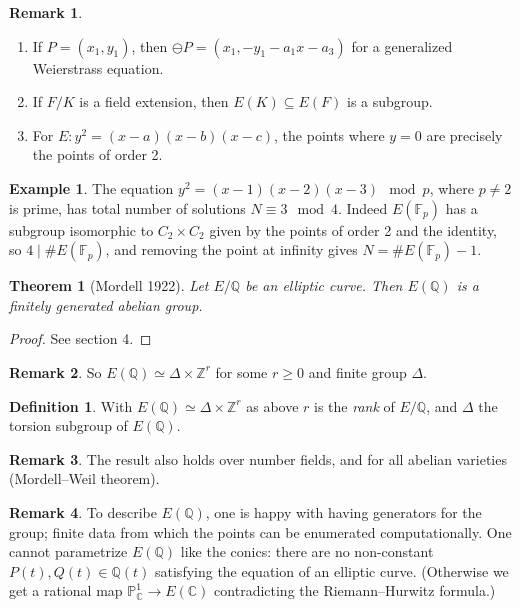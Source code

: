 \documentclass[a4paper]{article}
\newtheorem{theorem}{Theorem}
\theoremstyle{definition}
\newtheorem*{definition}{Definition}
\newtheorem*{remark}{Remark}
\newtheorem*{example}{Example}
\renewcommand{\P}{\mathbb{P}}
\newcommand{\F}{\mathbb{F}}
\newcommand{\Z}{\mathbb{Z}}
\newcommand{\Q}{\mathbb{Q}}
\newcommand{\C}{\mathbb{C}}
\begin{document}
\begin{remark}
    \begin{enumerate}[label=(\roman*)]
        \item If $P=(x_1,y_1)$, then $\ominus P=(x_1,-y_1-a_1x-a_3)$ for a
            generalized Weierstrass equation.

        \item If $F/K$ is a field extension, then $E(K)\subseteq E(F)$ is a
            subgroup.

        \item For $E:y^2=(x-a)(x-b)(x-c)$, the points where $y=0$ are precisely
            the points of order 2.
    \end{enumerate}
\end{remark}

\begin{example}
    The equation $y^2=(x-1)(x-2)(x-3)\mod p$, where $p\ne2$ is prime, has
    total number of solutions $N\equiv3\mod 4$. Indeed $E(\F_p)$ has a subgroup
    isomorphic to $C_2\times C_2$ given by the points of order 2 and the
    identity, so $4\mid\#E(\F_p)$, and removing the point at infinity gives
    $N=\#E(\F_p)-1$.
\end{example}

\begin{theorem}[Mordell 1922]
    Let $E/\Q$ be an elliptic curve. Then $E(\Q)$ is a finitely generated
    abelian group.
\end{theorem}

\begin{proof}
    See section 4.
\end{proof}

\begin{remark}
    So $E(\Q)\simeq\Delta\times\Z^r$ for some $r\ge0$ and finite group $\Delta$.
\end{remark}

\begin{definition}
    With $E(\Q)\simeq\Delta\times\Z^r$ as above $r$ is the \emph{rank} of
    $E/\Q$, and $\Delta$ the torsion subgroup of $E(\Q)$.
\end{definition}

\begin{remark}
    The result also holds over number fields, and for all abelian varieties
    (Mordell--Weil theorem).
\end{remark}

\begin{remark}
    To describe $E(\Q)$, one is happy with having generators for the group;
    finite data from which the points can be enumerated computationally. One
    cannot parametrize $E(\Q)$ like the conics: there are no non-constant
    $P(t),Q(t)\in\Q(t)$ satisfying the equation of an elliptic curve. (Otherwise
    we get a rational map $\P^1_\C\to E(\C)$ contradicting the Riemann--Hurwitz
    formula.)
\end{remark}
\end{document}
